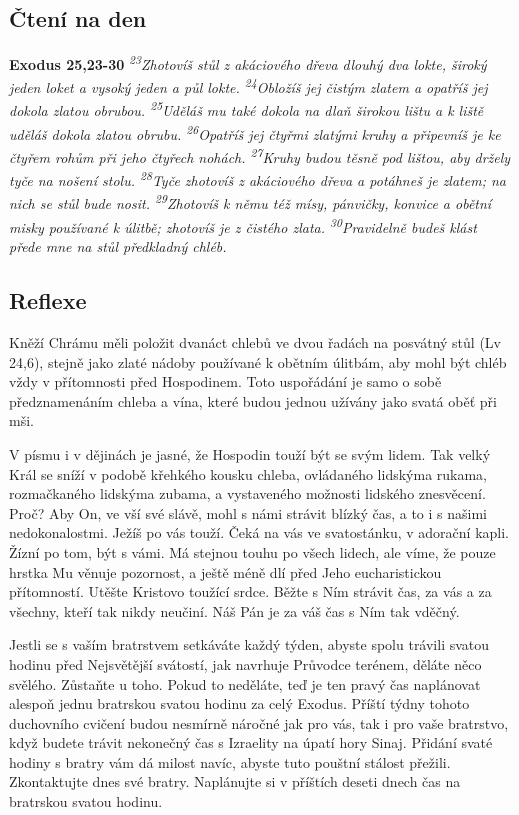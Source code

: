 \documentclass[11pt]{article}
\begin{document}
\subsection*{Čtení na den}
\textbf{Exodus 25,23-30}
\newline
\textit{
\textsuperscript{23}Zhotovíš stůl z akáciového dřeva dlouhý dva lokte, široký jeden loket a vysoký jeden a půl lokte.
\textsuperscript{24}Obložíš jej čistým zlatem a opatříš jej dokola zlatou obrubou.
\textsuperscript{25}Uděláš mu také dokola na dlaň širokou lištu a k liště uděláš dokola zlatou obrubu.
\textsuperscript{26}Opatříš jej čtyřmi zlatými kruhy a připevníš je ke čtyřem rohům při jeho čtyřech nohách.
\textsuperscript{27}Kruhy budou těsně pod lištou, aby držely tyče na nošení stolu.
\textsuperscript{28}Tyče zhotovíš z akáciového dřeva a potáhneš je zlatem; na nich se stůl bude nosit.
\textsuperscript{29}Zhotovíš k němu též mísy, pánvičky, konvice a obětní misky používané k úlitbě; zhotovíš je z čistého zlata.
\textsuperscript{30}Pravidelně budeš klást přede mne na stůl předkladný chléb.
}

\subsection*{Reflexe}
Kněží Chrámu měli položit dvanáct chlebů ve dvou řadách na posvátný stůl (Lv 24,6), stejně jako zlaté nádoby používané
k obětním úlitbám, aby mohl být chléb vždy v přítomnosti před Hospodinem. Toto uspořádání je samo o sobě předznamenáním
chleba a vína, které budou jednou užívány jako svatá oběť při mši.

V písmu i v dějinách je jasné, že Hospodin touží být se svým lidem. Tak velký Král se sníží v podobě křehkého kousku chleba,
ovládaného lidskýma rukama, rozmačkaného lidskýma zubama, a vystaveného možnosti lidského znesvěcení. Proč? Aby On, ve
vší své slávě, mohl s námi strávit blízký čas, a to i s našimi nedokonalostmi. Ježíš po vás touží. Čeká na vás ve svatostánku,
v adorační kapli. Žízní po tom, být s vámi. Má stejnou touhu po všech lidech, ale víme, že pouze hrstka Mu věnuje pozornost, a
ještě méně dlí před Jeho eucharistickou přítomností. Utěšte Kristovo toužící srdce. Běžte s Ním strávit čas, za vás a za všechny,
kteří tak nikdy neučiní. Náš Pán je za váš čas s Ním tak vděčný.

Jestli se s vaším bratrstvem setkáváte každý týden, abyste spolu trávili svatou hodinu před Nejsvětější svátostí, jak navrhuje
Průvodce terénem, děláte něco svělého. Zůstaňte u toho. Pokud to neděláte, teď je ten pravý čas naplánovat alespoň jednu
bratrskou svatou hodinu za celý Exodus. Příští týdny tohoto duchovního cvičení budou nesmírně náročné jak pro vás, tak i pro vaše
bratrstvo, když budete trávit nekonečný čas s Izraelity na úpatí hory Sinaj. Přidání svaté hodiny s bratry vám dá milost navíc,
abyste tuto pouštní stálost přežili. Zkontaktujte dnes své bratry. Naplánujte si v příštích deseti dnech čas na bratrskou svatou
hodinu.
\end{document}
